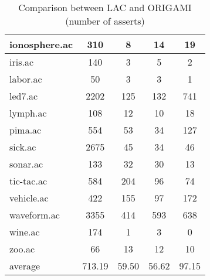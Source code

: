 \begin{table}[htbp]
\begin{tabular}{|l|c|c|c|c|}
		\hline
		ionosphere.ac   & 310           & 8                  & 14                       & 19                            \\
		\hline
		iris.ac         & 140           & 3                  & 5                        & 2                             \\
		\hline
		labor.ac        & 50            & 3                  & 3                        & 1                             \\
		\hline
		led7.ac         & 2202          & 125                & 132                      & 741                           \\
		\hline
		lymph.ac        & 108           & 12                 & 10                       & 18                            \\
		\hline
		pima.ac         & 554           & 53                 & 34                       & 127                           \\
		\hline
		sick.ac         & 2675          & 45                 & 34                       & 46                            \\
		\hline
		sonar.ac        & 133           & 32                 & 30                       & 13                            \\
		\hline
		tic-tac.ac      & 584           & 204                & 96                       & 74                            \\
		\hline
		vehicle.ac      & 422           & 155                & 97                       & 172                           \\
		\hline
		waveform.ac     & 3355          & 414                & 593                      & 638                           \\
		\hline
		wine.ac         & 174           & 1                  & 3                        & 0                             \\
		\hline
		zoo.ac          & 66            & 13                 & 12                       & 10                            \\
		\hline
		average         & 713.19        & 59.50              & 56.62                    & 97.15                         \\
		\hline
		\end{tabular}
	\caption{Comparison between LAC and ORIGAMI (number of asserts)}
	\label{tab:comparison_lac_origami}
\end{table}